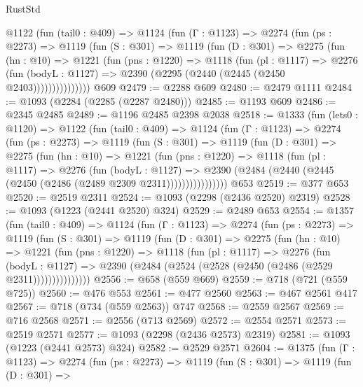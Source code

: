 \begin{lexlean}{RustStd}
\begin{coremodule}
{\begin{coremodule}
{{{{{{{{      @1122
        (fun (tail0 : @409) =>
        @1124
          (fun (Γ : @1123) =>
          @2274
            (fun (ps : @2273) =>
            @1119
              (fun (S : @301) =>
              @1119
                (fun (D : @301) =>
                @2275
                  (fun (hn : @10) =>
                  @1221
                    (fun (pns : @1220) =>
                    @1118
                      (fun (pl : @1117) =>
                      @2276
                        (fun (bodyL : @1127) =>
                        @2390 (@2295 (@2440 (@2445 (@2450 @2403)))))))))))))))
    @609
@2479 := @2288 @609
@2480 := @2479 @1111
@2484 := @1093 (@2284 (@2285 (@2287 @2480)))
@2485 := @1193 @609
@2486 := @2345 @2485
@2489 := @1196 @2485 @2398 @2038
@2518 := @1333
    (fun (lets0 : @1120) =>
    @1122
      (fun (tail0 : @409) =>
      @1124
        (fun (Γ : @1123) =>
        @2274
          (fun (ps : @2273) =>
          @1119
            (fun (S : @301) =>
            @1119
              (fun (D : @301) =>
              @2275
                (fun (hn : @10) =>
                @1221
                  (fun (pns : @1220) =>
                  @1118
                    (fun (pl : @1117) =>
                    @2276
                      (fun (bodyL : @1127) =>
                      @2390 (@2484 (@2440 (@2445 (@2450 (@2486 (@2489 @2309 @2311))))))))))))))))
    @653
@2519 := @377 @653
@2520 := @2519 @2311
@2524 := @1093 (@2298 (@2436 @2520) @2319)
@2528 := @1093 (@1223 (@2441 @2520) @324)
@2529 := @2489 @653
@2554 := @1357
    (fun (tail0 : @409) =>
    @1124
      (fun (Γ : @1123) =>
      @2274
        (fun (ps : @2273) =>
        @1119
          (fun (S : @301) =>
          @1119
            (fun (D : @301) =>
            @2275
              (fun (hn : @10) =>
              @1221
                (fun (pns : @1220) =>
                @1118
                  (fun (pl : @1117) =>
                  @2276
                    (fun (bodyL : @1127) =>
                    @2390 (@2484 (@2524 (@2528 (@2450 (@2486 (@2529 @2311)))))))))))))))
@2556 := @658 (@559 @669)
@2559 := @718 (@721 (@559 @725))
@2560 := @476 @553
@2561 := @477 @2560
@2563 := @467 @2561 @417
@2567 := @718 (@734 (@559 @2563)) @747
@2568 := @2559 @2567
@2569 := @716 @2568
@2571 := @2556 (@713 @2569)
@2572 := @2554 @2571
@2573 := @2519 @2571
@2577 := @1093 (@2298 (@2436 @2573) @2319)
@2581 := @1093 (@1223 (@2441 @2573) @324)
@2582 := @2529 @2571
@2604 := @1375
    (fun (Γ : @1123) =>
    @2274
      (fun (ps : @2273) =>
      @1119
        (fun (S : @301) =>
        @1119
          (fun (D : @301) =>
}}}}}}}}
\end{coremodule}}
\end{coremodule}
\end{lexlean}
